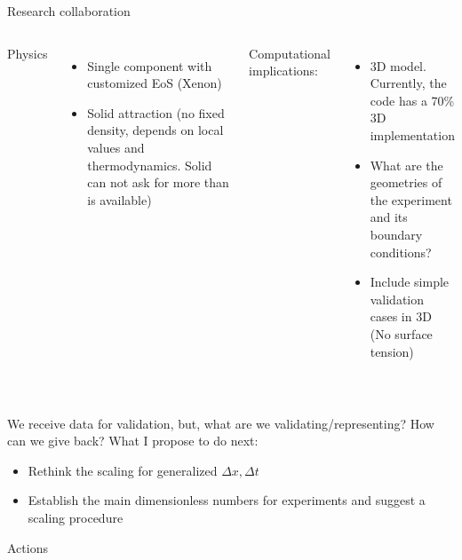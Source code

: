 \documentclass{beamer}
\begin{document}
	\begin{frame}{Research collaboration}
		
		\begin{columns}
			
			Physics
			\begin{itemize}
				\item Single component with customized EoS (Xenon) 
				\item Solid attraction (no fixed density, depends on local values and thermodynamics. Solid can not ask for more than is available)
			\end{itemize}
			
			Computational implications:
			\begin{itemize}
				\item 3D model. Currently, the code has a 70\% 3D implementation
				\item What are the geometries of the experiment and its boundary conditions?
				\item Include simple validation cases in 3D (No surface tension)
			\end{itemize}
		\end{columns}
		~\\
		We receive data for validation, but, what are we validating/representing? How can we give back? What I propose to do next:
		\begin{itemize}
			\item Rethink the scaling for generalized $\Delta x, \Delta t$
			\item Establish the main dimensionless numbers for experiments and suggest a scaling procedure
		\end{itemize}
		
	\end{frame}

	\begin{frame}{Actions}
	\end{frame}
	
\end{document}
